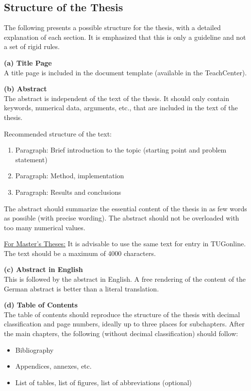 \subsection{Structure of the Thesis}
\label{sec:structureOfThesis}

The following presents a possible structure for the thesis, with a detailed explanation of each section. It is emphasized that this is only a guideline and not a set of rigid rules.

\textbf{(a) Title Page} \\
A title page is included in the document template (available in the TeachCenter).

\textbf{(b) Abstract} \\
The abstract is independent of the text of the thesis. It should only contain keywords, numerical data, arguments, etc., that are included in the text of the thesis.

Recommended structure of the text:
\begin{enumerate}
    \item Paragraph: Brief introduction to the topic (starting point and problem statement)
    \item Paragraph: Method, implementation
    \item Paragraph: Results and conclusions
\end{enumerate}

The abstract should summarize the essential content of the thesis in as few words as possible (with precise wording). The abstract should not be overloaded with too many numerical values.

\underline{For Master's Theses:} It is advisable to use the same text for entry in TUGonline. The text should be a maximum of \num{4000} characters.

\textbf{(c) Abstract in English} \\
This is followed by the abstract in English. A free rendering of the content of the German abstract is better than a literal translation.

\textbf{(d) Table of Contents} \\
The table of contents should reproduce the structure of the thesis with decimal classification and page numbers, ideally up to three places for subchapters. After the main chapters, the following (without decimal classification) should follow:

\begin{itemize}
    \item Bibliography
    \item Appendices, annexes, etc.
    \item List of tables, list of figures, list of abbreviations (optional)
\end{itemize}

